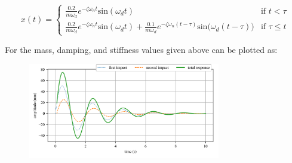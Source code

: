 \documentclass[12pt,letter]{article}
\begin{document}
\begin{example}
	\[
	x(t) = 
	\begin{cases}
		\frac{0.2}{m \omega_d} e^{-\zeta \omega_n t} \text{sin}(\omega_dt) & \text{if } t < \tau \\
		\frac{0.2}{m \omega_d} e^{-\zeta \omega_n t} \text{sin}(\omega_dt)  + \frac{0.1}{m \omega_d} e^{-\zeta \omega_n (t-\tau)} \text{sin}\big(\omega_d(t-\tau)\big) & \text{if } \tau \leq t 
	\end{cases}
	\]
	
	
	For the mass, damping, and stiffness values given above can be plotted as:
	\begin{figure}[H]
		\centering
		\includegraphics[width=0.75\textwidth]{../figures/response_double_impact.png}
	\end{figure}
	
\end{example}
\end{document}
